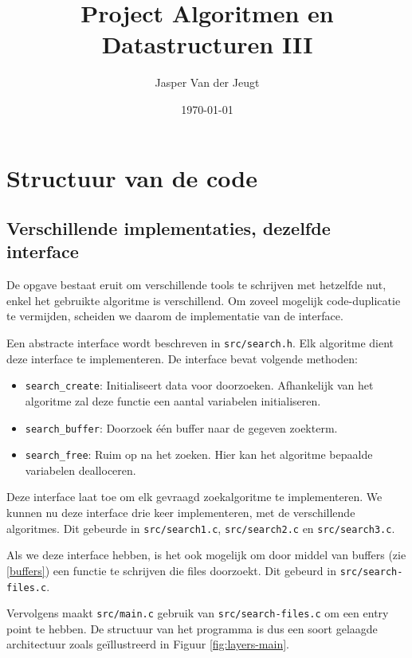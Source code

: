 \documentclass[a4paper,11pt]{article}
\title{Project Algoritmen en Datastructuren III}
\author{Jasper Van der Jeugt}
\date{\today}
\begin{document}
\maketitle
\tableofcontents

\section{Structuur van de code}

\subsection{Verschillende implementaties, dezelfde interface}
\label{interface}

De opgave bestaat eruit om verschillende tools te schrijven met hetzelfde nut,
enkel het gebruikte algoritme is verschillend. Om zoveel mogelijk
code-duplicatie te vermijden, scheiden we daarom de implementatie van de
interface.

Een abstracte interface wordt beschreven in \verb#src/search.h#. Elk algoritme
dient deze interface te implementeren. De interface bevat volgende methoden:

\begin{itemize}
    \item \verb#search_create#: Initialiseert data voor doorzoeken. Afhankelijk
    van het algoritme zal deze functie een aantal variabelen initialiseren.
    \item \verb#search_buffer#: Doorzoek \'e\'en buffer naar de gegeven
    zoekterm.
    \item \verb#search_free#: Ruim op na het zoeken. Hier kan het algoritme
    bepaalde variabelen dealloceren.
\end{itemize}

Deze interface laat toe om elk gevraagd zoekalgoritme te implementeren. We
kunnen nu deze interface drie keer implementeren, met de verschillende
algoritmes. Dit gebeurde in \verb#src/search1.c#, \verb#src/search2.c# en
\verb#src/search3.c#.

Als we deze interface hebben, is het ook mogelijk om door middel van buffers
(zie \ref{buffers}) een functie te schrijven die files doorzoekt. Dit gebeurd in
\verb#src/search-files.c#.

Vervolgens maakt \verb#src/main.c# gebruik van \verb#src/search-files.c# om een
entry point te hebben. De structuur van het programma is dus een soort gelaagde
architectuur zoals ge\"illustreerd in Figuur \ref{fig:layers-main}.
\end{document}
